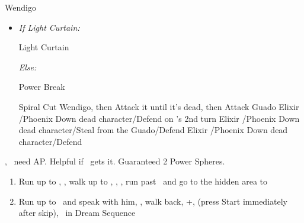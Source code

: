 \winvfill
\bothvfill
\begin{battle}[18000]{Wendigo}
    \begin{itemize}
        \tidusf Haste \tidus
        \tidusf Switch Weapon to Brotherhood
        \tidusf Attack Guado B (Top One)
        \item \textit{If Light Curtain:}
        \begin{itemize}
            \rikkuf Light Curtain \tidus
        \end{itemize}
        \textit{Else:}
        \begin{itemize}
            \switch{\rikku}{\auron}
            \auronf Power Break
        \end{itemize}
        \tidusf Spiral Cut Wendigo, then Attack it until it's dead, then Attack Guado
        \yunaf Elixir \tidus/Phoenix Down dead character/Defend
        \switch{\yuna}{\lulu} on \yuna's 2nd turn
        \rikkuf Elixir \tidus/Phoenix Down dead character/Steal from the Guado/Defend
        \luluf Elixir \tidus/Phoenix Down dead character/Defend
    \end{itemize}
    \yuna, \tidus\ need AP. Helpful if \lulu\ gets it.
    Guaranteed 2 Power Spheres.
\end{battle}
\begin{enumerate}[resume]
    \item Run up to \rikku, \sd, walk up to \yuna, \sd, \save, run past \kimahri\ and go to the hidden area to 
    \winvfill
    \item Run up to \auron\ and speak with him, \sd, walk back, \cs+\skippablefmv[1:00], (press Start immediately after skip), \sd\ in Dream Sequence
\end{enumerate}